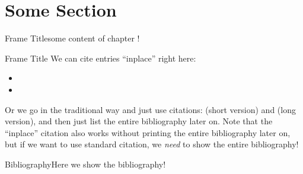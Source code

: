 \section{Some Section}

\begin{frame}{Frame Title}some content of chapter \ChapterNumber!\end{frame}

\begin{frame}{Frame Title}
We can cite entries ``inplace'' right here: 
\begin{itemize}
 \item {}
 \item {}
\end{itemize}

Or we go in the traditional way and just use citations: \cite{Slaney2015Logic4Fun} (short version) and \cite{Slaney2017LogicForFun} (long version), and then just list the entire bibliography later on. Note that the ``inplace'' citation also works without printing the entire bibliography later on, but if we want to use standard citation, we \emph{need} to show the entire bibliography!\\

\end{frame}

\begin{frame}{Bibliography}Here we show the bibliography!\\\printbibliography[heading=none]\end{frame}
